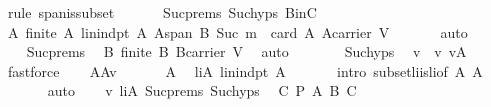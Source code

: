 \begin{isabellebody}
\ {\isacharparenleft}rule\ span{\isacharunderscore}is{\isacharunderscore}subset{}{\isacharparenright}\isanewline
\ \ \isanewline
\ \ \isamarkupfalse%
\ Suc{\isachardot}prems\ Suc{\isachardot}hyps\ BinC\ \isamarkupfalse%
\ A{\isacharcolon}\ {\isachardoublequoteopen}finite\ A{\isachardoublequoteclose}\ {\isachardoublequoteopen}lin{\isacharunderscore}indpt\ A{\isachardoublequoteclose}\ {\isachardoublequoteopen}A{\isasymsubseteq}span\ B{\isachardoublequoteclose}\ {\isachardoublequoteopen}Suc\ m\ {\isacharequal}\ card\ A{\isachardoublequoteclose}\ {\isachardoublequoteopen}A{\isasymsubseteq}carrier\ V{\isachardoublequoteclose}\ \isanewline
\ \ \ \ \isamarkupfalse%
\ auto\isanewline
\ \ \isanewline
\ \ \isamarkupfalse%
\ Suc{\isachardot}prems\ \isamarkupfalse%
\ B{\isacharcolon}\ {\isachardoublequoteopen}finite\ B{\isachardoublequoteclose}\ {\isachardoublequoteopen}B{\isasymsubseteq}carrier\ V{\isachardoublequoteclose}\ \isamarkupfalse%
\ auto\isanewline
\ \ \ \isanewline
\ \ \isamarkupfalse%
\ Suc{\isachardot}hyps{\isacharparenleft}{}{\isacharparenright}\ \isamarkupfalse%
\ v\ \ v{\isacharcolon}\ {\isachardoublequoteopen}v{\isasymin}A{\isachardoublequoteclose}\ \isamarkupfalse%
\ fastforce\isanewline
\ \ \isamarkupfalse%
\ {\isacharquery}A{\isacharprime}{\isacharequal}{\isachardoublequoteopen}A{\isacharminus}{\isacharbraceleft}v{\isacharbraceright}{\isachardoublequoteclose}\isanewline
\ \ \isanewline
\ \ \isamarkupfalse%
\ A{\isacharparenleft}{}{\isacharparenright}\ \isamarkupfalse%
\ liA{\isacharprime}{\isacharcolon}\ {\isachardoublequoteopen}lin{\isacharunderscore}indpt\ {\isacharquery}A{\isacharprime}{\isachardoublequoteclose}\ \isanewline
\ \ \ \ \isamarkupfalse%
\ {\isacharparenleft}intro\ subset{\isacharunderscore}li{\isacharunderscore}is{\isacharunderscore}li{\isacharbrackleft}of\ {\isachardoublequoteopen}A{\isachardoublequoteclose}\ {\isachardoublequoteopen}{\isacharquery}A{\isacharprime}{\isachardoublequoteclose}{\isacharbrackright}{\isacharparenright}\ \isanewline
\ \ \ \ \ \isamarkupfalse%
\ auto\isanewline
\ \ \isamarkupfalse%
\ v\ liA{\isacharprime}\ Suc{\isachardot}prems\ Suc{\isachardot}hyps{\isacharparenleft}{}{\isacharparenright}\ \isamarkupfalse%
\ {\isachardoublequoteopen}{\isasymexists}C{\isacharprime}{\isachardot}\ {\isacharquery}P\ {\isacharquery}A{\isacharprime}\ B\ C{\isacharprime}{\isachardoublequoteclose}\ \isanewline

\end{isabellebody}
